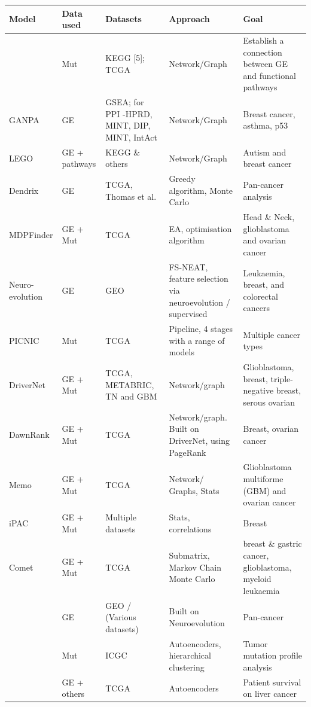 \begin{appendices}
    
{\footnotesize %
\begin{longtable}{|p{3cm}|p{1.8cm}|p{2.2cm}|p{2.8cm}|p{3.5cm}|}
\hline 
\textbf{Model} & \textbf{Data used} & \textbf{Datasets} & \textbf{Approach} & \textbf{Goal} \\ 
\hline 
\endfirsthead

\endlastfoot    
\citet{Cava2018-rv} & Mut & KEGG [5]; TCGA  & Network/Graph & Establish a connection between GE and functional pathways  \\ \hline
GANPA & GE  & GSEA; for PPI -HPRD, MINT, DIP, MINT, IntAct & Network/Graph & Breast cancer, asthma, p53 \\ \hline
LEGO & GE + pathways & KEGG \& others & Network/Graph & Autism and breast cancer \\ \hline
Dendrix & GE & TCGA, Thomas et al. & Greedy algorithm, Monte Carlo & Pan-cancer analysis \\ \hline
MDPFinder & GE + Mut & TCGA & EA, optimisation algorithm & Head \& Neck, glioblastoma and ovarian cancer \\ \hline
Neuro-evolution & GE & GEO & FS-NEAT, feature selection via neuroevolution / supervised & Leukaemia, breast, and colorectal cancers \\ \hline
PICNIC  & Mut & TCGA  & Pipeline, 4 stages with a range of models & Multiple cancer types  \\ \hline
DriverNet & GE + Mut & TCGA, METABRIC, TN and GBM & Network/graph &  Glioblastoma, breast, triple-negative breast, serous ovarian \\ \hline
DawnRank & GE + Mut & TCGA & Network/graph. Built on DriverNet, using PageRank & Breast, ovarian cancer \\ \hline
Memo & GE + Mut & TCGA & Network/ Graphs, Stats & Glioblastoma multiforme (GBM) and ovarian cancer \\ \hline
iPAC & GE + Mut & Multiple datasets & Stats, correlations & Breast \\ \hline
Comet  & GE + Mut & TCGA & Submatrix, Markov Chain Monte Carlo & breast \& gastric cancer, glioblastoma, myeloid leukaemia \\ \hline
\citet{Feltes2019-bd} & GE  & GEO / (Various datasets) & Built on Neuroevolution & Pan-cancer \\ \hline
\citet{Palazzo2019-hx} & Mut & ICGC & Autoencoders, hierarchical clustering & Tumor mutation profile analysis \\ \hline
\citet{Chaudhary2018-qj} & GE + others & TCGA & Autoencoders & Patient survival on liver cancer \\ \hline

\end{longtable}}
\end{appendices}
